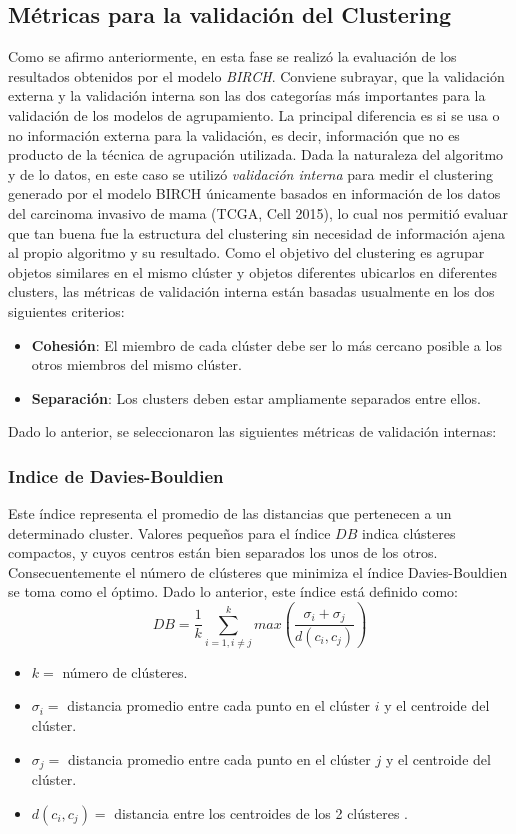 \subsection{Métricas para la validación del Clustering}
Como se afirmo anteriormente, en esta fase se realizó la evaluación de los resultados obtenidos por el modelo \textit{BIRCH}. Conviene subrayar, que la validación externa y la validación interna son las dos categorías más importantes para la validación de los modelos de agrupamiento. La principal diferencia es si se usa o no información externa para la validación, es decir, información que no es producto de la técnica de agrupación utilizada\cite{Elizabeth2023}. Dada la naturaleza del algoritmo y de lo datos, en este caso se utilizó \textit{validación interna} para medir el clustering generado por el modelo BIRCH únicamente basados en información de los datos del carcinoma invasivo de mama (TCGA, Cell 2015), lo cual nos permitió evaluar que tan buena fue la estructura del clustering sin necesidad de información ajena al propio algoritmo y su resultado. Como el objetivo del clustering es agrupar objetos similares en el mismo clúster y objetos diferentes ubicarlos en diferentes clusters, las métricas de validación interna están basadas usualmente en los dos siguientes criterios\cite{Elizabeth2023}:
\begin{itemize}[label=\HandRight]
	\item \textbf{Cohesión}: El miembro de cada clúster debe ser lo más cercano posible a los otros miembros del mismo clúster.
	\item \textbf{Separación}: Los clusters deben estar ampliamente separados entre ellos.
\end{itemize}
Dado lo anterior, se seleccionaron las siguientes métricas de validación internas:
\subsubsection{Indice de Davies-Bouldien}
Este índice representa el promedio de las distancias que pertenecen a un determinado cluster.	Valores pequeños para el índice $DB$ indica clústeres compactos, y cuyos centros están bien separados los unos de los otros. Consecuentemente el número de clústeres que minimiza el índice Davies-Bouldien se toma como el óptimo. Dado lo anterior, este índice está definido como:
\begin{equation}
	DB = \frac{1}{k} \sum_{i=1,i\neq j}^{k} max \left( \frac{\sigma_{i}+\sigma_{j}}{d(c_{i},c_{j})}\right) 
\end{equation}
\begin{itemize}[label=]
	\item $k=$ número de clústeres.
	\item $\sigma_{i}=$ distancia promedio entre cada punto en el clúster $i$ y el centroide del clúster.
	\item $\sigma_{j}=$ distancia promedio entre cada punto en el clúster $j$ y el centroide del clúster.
	\item $d(c_{i},c_{j})=$ distancia entre los centroides de los 2 clústeres .
\end{itemize}
